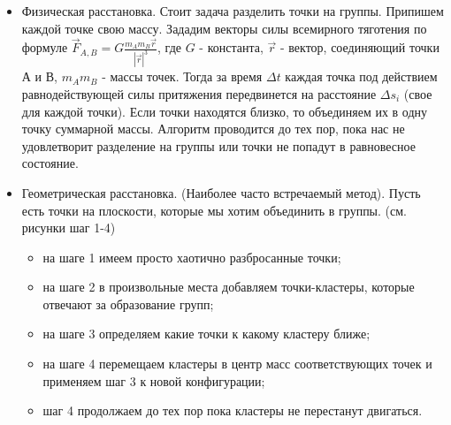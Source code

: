 \begin {itemize}
\item  Физическая расстановка.
Стоит задача разделить точки на группы. Припишем каждой точке свою массу. Зададим векторы силы всемирного тяготения по формуле 
$\vec{F}_{A,B} = G \frac{m_{A} m_{B}\vec{r}}{|\vec{r}|^3}$, где $G$ - константа, $\vec{r}$ - вектор, соединяющий точки А и В, $m_{A} m_{B}$ - массы точек. Тогда за время $\Delta t$ каждая точка под действием равнодействующей силы притяжения передвинется на расстояние $\Delta s_i$ (свое для каждой точки). Если точки находятся близко, то объединяем их в одну точку суммарной массы. Алгоритм проводится до тех пор, пока нас не удовлетворит разделение на группы или точки не попадут в равновесное состояние.  

\item Геометрическая расстановка. (Наиболее часто встречаемый метод). Пусть есть точки на плоскости, которые мы хотим объединить в группы. (см. рисунки шаг 1-4)
\begin{itemize}
\item на шаге 1 имеем просто хаотично разбросанные точки;
\item на шаге 2 в произвольные места добавляем точки-кластеры, которые отвечают за образование групп;
\item на шаге 3 определяем какие точки к какому кластеру ближе;
\item на шаге 4 перемещаем кластеры в центр масс соответствующих точек и применяем шаг 3 к новой конфигурации;
\item шаг 4 продолжаем до тех пор пока кластеры не перестанут двигаться.
\end{itemize}


\end{itemize}
